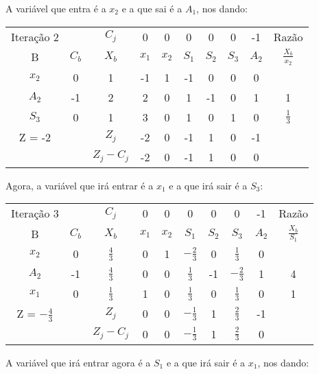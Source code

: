 \documentclass[11pt]{article}
\begin{document}
A variável que entra é a \(x_2\) e a que sai é a \(A_1\), nos dando:

\begin{center}
\begin{tabular}{c c c c c c c c c c}
Iteração 2 &  & \(C_j\) & 0 & 0 & 0 & 0 & 0 & -1 & Razão\\
B & \(C_b\) & \(X_b\) & \(x_1\) & \(x_2\) & \(S_1\) & \(S_2\) & \(S_3\) & \(A_2\) & \(\frac{X_b}{x_2}\)\\
\(x_2\) & 0 & 1 & -1 & 1 & -1 & 0 & 0 & 0 & \\
\(A_2\) & -1 & 2 & 2 & 0 & 1 & -1 & 0 & 1 & 1\\
\(S_3\) & 0 & 1 & 3 & 0 & 1 & 0 & 1 & 0 & \(\frac{1}{3}\)\\
Z = -2 &  & \(Z_j\) & -2 & 0 & -1 & 1 & 0 & -1 & \\
 &  & \(Z_j-C_j\) & -2 & 0 & -1 & 1 & 0 & 0 & \\
\end{tabular}
\end{center}

Agora, a variável que irá entrar é a \(x_1\) e a que irá sair é a \(S_3\):


\begin{center}
\begin{tabular}{c c c c c c c c c c}
Iteração 3 &  & \(C_j\) & 0 & 0 & 0 & 0 & 0 & -1 & Razão\\
B & \(C_b\) & \(X_b\) & \(x_1\) & \(x_2\) & \(S_1\) & \(S_2\) & \(S_3\) & \(A_2\) & \(\frac{X_b}{S_1}\)\\
\(x_2\) & 0 & \(\frac{4}{3}\) & 0 & 1 & \(-\frac{2}{3}\) & 0 & \(\frac{1}{3}\) & 0 & \\
\(A_2\) & -1 & \(\frac{4}{3}\) & 0 & 0 & \(\frac{1}{3}\) & -1 & \(-\frac{2}{3}\) & 1 & 4\\
\(x_1\) & 0 & \(\frac{1}{3}\) & 1 & 0 & \(\frac{1}{3}\) & 0 & \(\frac{1}{3}\) & 0 & 1\\
Z = \(-\frac{4}{3}\) &  & \(Z_j\) & 0 & 0 & \(-\frac{1}{3}\) & 1 & \(\frac{2}{3}\) & -1 & \\
 &  & \(Z_j-C_j\) & 0 & 0 & \(-\frac{1}{3}\) & 1 & \(\frac{2}{3}\) & 0 & \\
\end{tabular}
\end{center}

A variável que irá entrar agora é a \(S_1\) e a que irá sair é a \(x_1\), nos dando:
\end{document}
